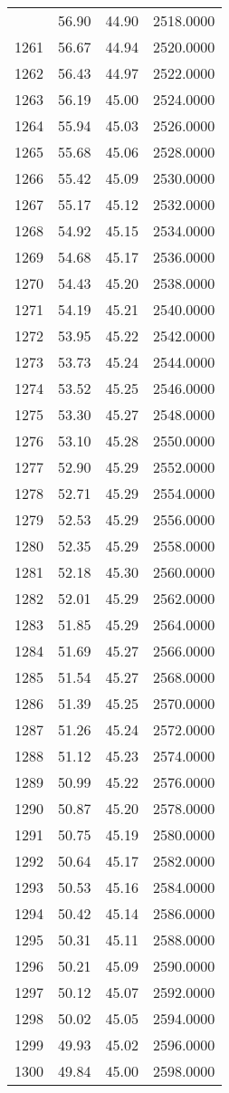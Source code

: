 \documentclass[
  captions=tableheading,
]{scrartcl}
\begin{document}
\begin{longtable} {l|l|l|l}
{1260	& 56.90 &	44.90 &	2518.0000 \\
1261	& 56.67 &	44.94 &	2520.0000 \\
1262	& 56.43 &	44.97 &	2522.0000 \\
1263	& 56.19 &	45.00 &	2524.0000 \\
1264	& 55.94 &	45.03 &	2526.0000 \\
1265	& 55.68 &	45.06 &	2528.0000 \\
1266	& 55.42 &	45.09 &	2530.0000 \\
1267	& 55.17 &	45.12 &	2532.0000 \\
1268	& 54.92 &	45.15 &	2534.0000 \\
1269	& 54.68 &	45.17 &	2536.0000 \\
1270	& 54.43 &	45.20 &	2538.0000 \\
1271	& 54.19 &	45.21 &	2540.0000 \\
1272	& 53.95 &	45.22 &	2542.0000 \\
1273	& 53.73 &	45.24 &	2544.0000 \\
1274	& 53.52 &	45.25 &	2546.0000 \\
1275	& 53.30 &	45.27 &	2548.0000 \\
1276	& 53.10 &	45.28 &	2550.0000 \\
1277	& 52.90 &	45.29 &	2552.0000 \\
1278	& 52.71 &	45.29 &	2554.0000 \\
1279	& 52.53 &	45.29 &	2556.0000 \\
1280	& 52.35 &	45.29 &	2558.0000 \\
1281	& 52.18 &	45.30 &	2560.0000 \\
1282	& 52.01 &	45.29 &	2562.0000 \\
1283	& 51.85 &	45.29 &	2564.0000 \\
1284	& 51.69 &	45.27 &	2566.0000 \\
1285	& 51.54 &	45.27 &	2568.0000 \\
1286	& 51.39 &	45.25 &	2570.0000 \\
1287	& 51.26 &	45.24 &	2572.0000 \\
1288	& 51.12 &	45.23 &	2574.0000 \\
1289	& 50.99 &	45.22 &	2576.0000 \\
1290	& 50.87 &	45.20 &	2578.0000 \\
1291	& 50.75 &	45.19 &	2580.0000 \\
1292	& 50.64 &	45.17 &	2582.0000 \\
1293	& 50.53 &	45.16 &	2584.0000 \\
1294	& 50.42 &	45.14 &	2586.0000 \\
1295	& 50.31 &	45.11 &	2588.0000 \\
1296	& 50.21 &	45.09 &	2590.0000 \\
1297	& 50.12 &	45.07 &	2592.0000 \\
1298	& 50.02 &	45.05 &	2594.0000 \\
1299	& 49.93 &	45.02 &	2596.0000 \\
1300	& 49.84 &	45.00 &	2598.0000 \\
\end{longtable}
\end{document}
